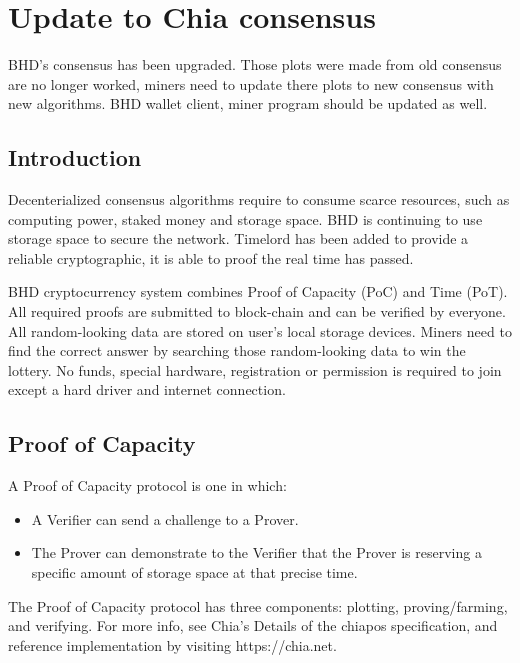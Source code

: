 \chapter{Update to Chia consensus}
\begin{flushleft}
    BHD's consensus has been upgraded. Those plots were made from old consensus are no longer worked, miners need to update there plots to new consensus with new algorithms. BHD wallet client, miner program should be updated as well.
\end{flushleft}
\section{Introduction}
\begin{flushleft}
    Decenterialized consensus algorithms require to consume scarce resources, such as computing power, staked money and storage space. BHD is continuing to use storage space to secure the network. Timelord has been added to provide a reliable cryptographic, it is able to proof the real time has passed.
\end{flushleft}
\begin{flushleft}
    BHD cryptocurrency system combines Proof of Capacity (PoC) and Time (PoT). All required proofs are submitted to block-chain and can be verified by everyone. All random-looking data are stored on user's local storage devices. Miners need to find the correct answer by searching those random-looking data to win the lottery. No funds, special hardware, registration or permission is required to join except a hard driver and internet connection.
\end{flushleft}
\section{Proof of Capacity}
\begin{flushleft}
    A Proof of Capacity protocol is one in which:
\end{flushleft}
\begin{itemize}
    \item A Verifier can send a challenge to a Prover.
    \item The Prover can demonstrate to the Verifier that the Prover is reserving a specific amount of storage space at that precise time.
\end{itemize}
\begin{flushleft}
    The Proof of Capacity protocol has three components: plotting, proving/farming, and verifying. For more info, see Chia's Details of the chiapos specification, and reference implementation by visiting https://chia.net.
\end{flushleft}

